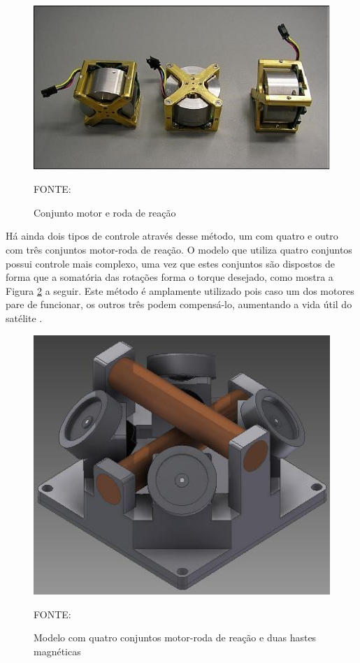 \documentclass[
	12pt,				%
	openany,			%
	twoside,			%
	a4paper,			%
	english,			%
	french,				%
	spanish,			%
	brazil,				%
	oldfontcommands
	]{abntex2}
\begin{document}
\begin{figure}[th]
	\caption{Conjunto motor e roda de reação}
	\centering
	\includegraphics[width=0.7\linewidth]{./figs/Shelf_Reaction_Wheel}
	
	\begin{small}
		FONTE: \cite{SWR}
	\end{small}
	\label{fig:SRW}
\end{figure}


Há ainda dois tipos de controle através desse método, um com quatro e outro com três conjuntos motor-roda de reação. O modelo que utiliza quatro conjuntos possui controle mais complexo, uma vez que estes conjuntos são dispostos de forma que a somatória das rotações forma o torque desejado, como mostra a Figura \ref{fig:ERW} a seguir. Este método é amplamente utilizado pois caso um dos motores pare de funcionar, os outros três podem compensá-lo, aumentando a vida útil do satélite \cite{Ericksson}.


\begin{figure}[th]
	\caption{Modelo com quatro conjuntos motor-roda de reação e duas hastes magnéticas}
	\centering
	\includegraphics[width=0.7\linewidth]{./figs/Ericksson_Reaction_Wheel}
	
	\begin{small}
		FONTE: \cite{Ericksson}
	\end{small}
	\label{fig:ERW}
\end{figure}
\end{document}
